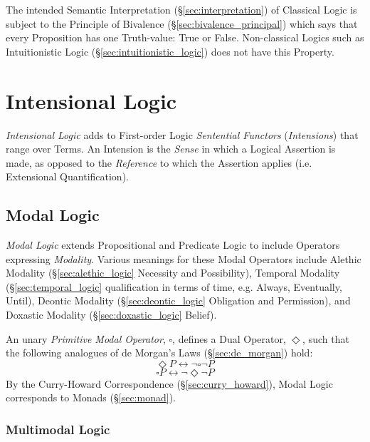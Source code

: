 The intended Semantic Interpretation (\S\ref{sec:interpretation}) of
Classical Logic is subject to the Principle of Bivalence
(\S\ref{sec:bivalence_principal}) which says that every Proposition
has one Truth-value: True or False. Non-classical Logics such as
Intuitionistic Logic (\S\ref{sec:intuitionistic_logic}) does not have
this Property.



\section{Intensional Logic}\label{sec:intensional_logic}

\emph{Intensional Logic} adds to First-order Logic \emph{Sentential
  Functors} (\emph{Intensions}) that range over Terms. An Intension is
the \emph{Sense} in which a Logical Assertion is made, as opposed to
the \emph{Reference} to which the Assertion applies (i.e. Extensional
Quantification).



\subsection{Modal Logic}\label{sec:modal_logic}

\emph{Modal Logic} extends Propositional and Predicate Logic to
include Operators expressing \emph{Modality}. Various meanings for
these Modal Operators include Alethic Modality
(\S\ref{sec:alethic_logic} Necessity and Possibility), Temporal
Modality (\S\ref{sec:temporal_logic} qualification in terms of time,
e.g. Always, Eventually, Until), Deontic Modality
(\S\ref{sec:deontic_logic} Obligation and Permission), and Doxastic
Modality (\S\ref{sec:doxastic_logic} Belief).

An unary \emph{Primitive Modal Operator}, $\square$, defines a Dual
Operator, $\Diamond$, such that the following analogues of de Morgan's
Laws (\S\ref{sec:de_morgan}) hold:
  \[\Diamond P \leftrightarrow \neg \square \neg P\]
  \[\square P \leftrightarrow \neg \Diamond \neg P\]
By the Curry-Howard Correspondence (\S\ref{sec:curry_howard}), Modal
Logic corresponds to Monads (\S\ref{sec:monad}).



\subsubsection{Multimodal Logic}\label{sec:multimodal_logic}

